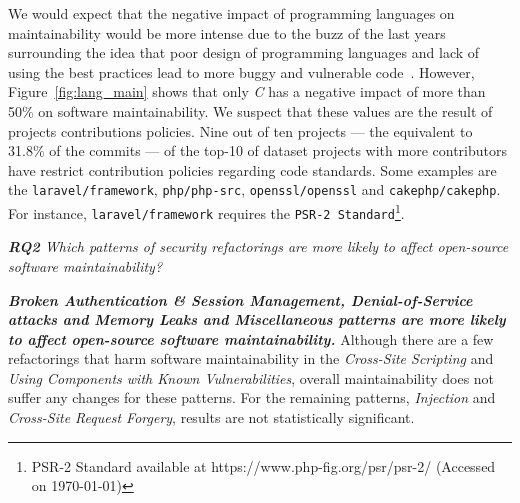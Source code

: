 \documentclass[10pt,conference]{IEEEtran}
\begin{document}
{\begin{itemize}
\end{itemize}


We would expect that the negative impact of programming languages on maintainability
would be more intense due to the buzz of the last years surrounding the idea that
poor design of programming languages and lack of using the best practices lead to
more buggy and vulnerable code~\cite{Ray:2017:LSP:3144574.3126905, 2019arXiv190110220B}.
However, Figure~\ref{fig:lang_main} shows that only \emph{C} has a negative impact of more than 50\% on software maintainability. We suspect that these values are the result of projects
contributions policies. Nine out of ten projects --- the equivalent to 31.8\% of the commits ---
of the top-10 of dataset projects with more contributors have restrict contribution
policies regarding code standards. Some examples are the \texttt{laravel/framework},
\texttt{php/php-src}, \texttt{openssl/openssl} and
\texttt{cakephp/cakephp}. For instance, \texttt{laravel/framework} requires the
\texttt{PSR-2 Standard}\footnote{PSR-2 Standard available at
https://www.php-fig.org/psr/psr-2/ (Accessed on \today{})}.

\begin{framed}
\textit{\textbf{RQ2} Which patterns of security refactorings are more likely to affect open-source software maintainability?}
\end{framed}

\textbf{\textit{Broken Authentication \& Session Management, Denial-of-Service attacks and Memory Leaks and Miscellaneous patterns are more likely to affect open-source software maintainability.}} Although there are
a few refactorings that harm software maintainability in the \emph{Cross-Site Scripting} and \emph{Using Components with Known Vulnerabilities}, overall maintainability does not suffer any changes for these patterns. For the remaining patterns, \emph{Injection} and \emph{Cross-Site Request Forgery}, results are not statistically significant.


}
\end{document}
